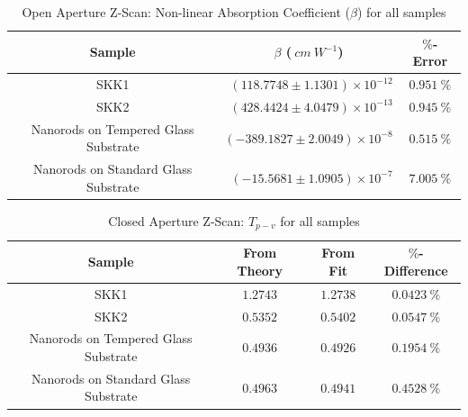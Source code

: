 \documentclass[%
 reprint,
amsmath,
amssymb,
10pt
]{revtex4-2}
\begin{document}
\begin{table}
 \begin{tabular}{c|r|c}
 \hline\hline
 \textbf{Sample} & \multicolumn{1}{c|}{$\beta$ ($\:cm\:W^{-1}$)}  & \textbf{$\%$-Error} \\
 \hline
 SKK1 & $(118.7748 \pm 1.1301)\times10^{-12}$ & $0.951\:\%$ \\
 SKK2 & $(428.4424 \pm 4.0479)\times10^{-13}$ & $0.945\:\%$ \\
 Nanorods on Tempered Glass Substrate & $(-389.1827 \pm 2.0049)\times10^{-8}$ & $0.515\:\%$ \\
 Nanorods on Standard Glass Substrate & $(-15.5681 \pm 1.0905)\times10^{-7}$ & $7.005\:\%$ \\
 \hline\hline
\end{tabular}
\caption{Open Aperture Z-Scan: Non-linear Absorption Coefficient ($\beta$) for all samples}
\label{table:oatab}
\end{table}

\begin{table}
 \begin{tabular}{c|c|c|c}
 \hline\hline
 \textbf{Sample} & \textbf{From Theory} & \textbf{From Fit} & \textbf{$\%$-Difference} \\
 \hline
 SKK1 & $1.2743$ & $1.2738$ & $0.0423\:\%$ \\
 SKK2 & $0.5352$ & $0.5402$ & $0.0547\:\%$ \\
 Nanorods on Tempered Glass Substrate & $0.4936$ & $0.4926$ & $0.1954\:\%$ \\
 Nanorods on Standard Glass Substrate & $0.4963$ & $0.4941$ & $0.4528\:\%$ \\
 \hline\hline
\end{tabular}
\caption{Closed Aperture Z-Scan: $T_{p-v}$ for all samples}
\label{table:catpv}
\end{table}
\end{document}
